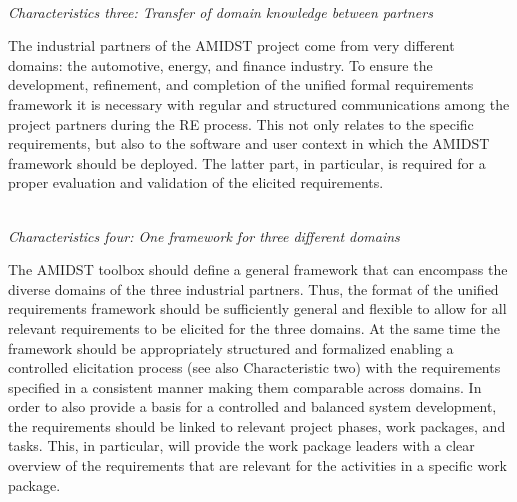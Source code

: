 
\ \\
\noindent \emph{Characteristics three: Transfer of domain knowledge between  partners}
\label{sec:characteristic3}

The industrial partners of the AMIDST project come from very different domains: the automotive, energy, and finance
industry. To ensure the development, refinement, and completion of the unified formal requirements framework it is
necessary with regular and structured communications among the project partners during the RE
process. This not only relates to the specific requirements, but also to the software and user context in which the
AMIDST framework should be deployed. The latter part, in particular, is required for a proper evaluation and validation
of the elicited requirements.



\ \\
\noindent \emph{Characteristics four:  One framework for three different domains}
\label{sec:characteristic4}

The AMIDST toolbox should define a general framework that can encompass the diverse domains of the three industrial
partners. Thus, the format of the unified requirements framework should be sufficiently general and flexible to
allow for all relevant requirements to be elicited for the three domains. At the same time the framework should be
appropriately structured and formalized enabling a controlled elicitation process (see also Characteristic two) with the
requirements specified in a consistent manner making them comparable across domains. In order to also provide a basis for a controlled and
balanced system development, the requirements should be linked to
relevant project phases, work packages, and tasks. This, in particular, will provide the work package leaders with
a clear overview of the requirements that are relevant for the activities in a specific work package.   

